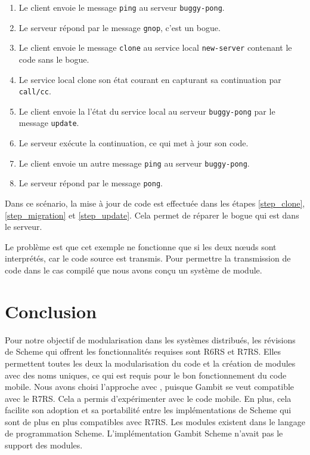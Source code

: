 \begin{enumerate}
  \item Le client envoie le message \texttt{ping} au serveur \texttt{buggy-pong}.
  \item Le serveur répond par le message \texttt{gnop}, c'est un bogue.
  \item Le client envoie le message \texttt{clone} au service local
    \texttt{new-server} contenant le code sans le bogue.

  \item\label{step_clone} Le service local clone son état courant en capturant sa
    continuation par \texttt{call/cc}.

  \item\label{step_migration} Le client envoie la l'état du service local au serveur \texttt{buggy-pong}
    par le message \texttt{update}.

  \item\label{step_update} Le serveur exécute la continuation, ce qui met à jour son code.

  \item Le client envoie un autre message \texttt{ping} au serveur \texttt{buggy-pong}.
  \item Le serveur répond par le message \texttt{pong}.
\end{enumerate}

Dans ce scénario, la mise à jour de code est effectuée dans les étapes
\ref{step_clone}, \ref{step_migration} et \ref{step_update}. Cela
permet de réparer le bogue qui est dans le serveur.

Le problème est que cet exemple ne fonctionne que si les deux nœuds sont interprétés,
car le code source est transmis. Pour permettre la transmission de code dans le cas
compilé que nous avons conçu un système de module.

\section{Conclusion}
%
Pour notre objectif de modularisation dans les systèmes distribués, les
révisions de Scheme qui offrent les fonctionnalités requises sont R6RS et R7RS.
Elles permettent toutes les deux la modularisation du code et la création de
modules avec des noms uniques, ce qui est requis pour le bon fonctionnement du
code mobile.   Nous avons choisi l'approche avec ,
puisque Gambit se veut compatible avec le R7RS. Cela a permis d'expérimenter
avec le code mobile. En plus, cela facilite son adoption et sa portabilité
entre les implémentations de Scheme qui sont de plus en plus compatibles avec
R7RS.
Les modules existent dans le langage de programmation Scheme. L'implémentation
Gambit Scheme n'avait pas le support des modules.

